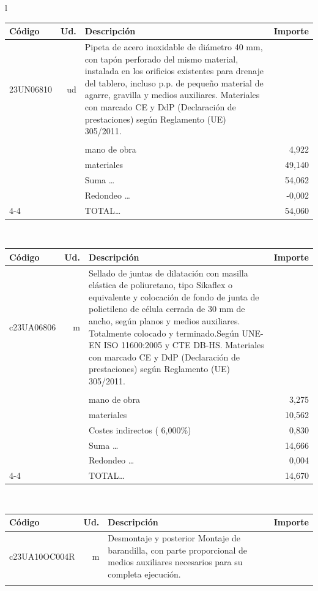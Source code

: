 \documentclass{book}%
\begin{document}
\begin{longtable}{l}
\begin{tabular}{l r p{60mm} r}%
Código&Ud.&Descripción&Importe\\%
\hline%
23UN06810&ud&Pipeta de acero inoxidable de diámetro 40 mm, con tapón perforado del mismo material, instalada en los orificios existentes para drenaje del tablero, incluso p.p. de pequeño material de agarre, gravilla y medios auxiliares. Materiales con marcado CE y DdP (Declaración de prestaciones) según Reglamento (UE) 305/2011.&\\%
&&&\\%
&&mano de obra&     4,922\\%
&&materiales&    49,140\\%
&&Suma \ldots&    54,062\\%
&&Redondeo \ldots&    {-}0,002\\%
\cline{4-4}%
&&TOTAL\ldots&    54,060\\%
\end{tabular}\\%
\begin{tabular}{l r p{60mm} r}%
Código&Ud.&Descripción&Importe\\%
\hline%
c23UA06806&m&Sellado de juntas de dilatación con masilla elástica de poliuretano, tipo Sikaflex o equivalente y colocación de fondo de junta de polietileno de célula cerrada de 30 mm de ancho, según planos y medios auxiliares. Totalmente colocado y terminado.Según UNE{-}EN ISO 11600:2005 y CTE DB{-}HS. Materiales con marcado CE y DdP (Declaración de prestaciones) según Reglamento (UE) 305/2011.&\\%
&&&\\%
&&mano de obra&     3,275\\%
&&materiales&    10,562\\%
&&Costes indirectos (     6,000\%)&     0,830\\%
&&Suma \ldots&    14,666\\%
&&Redondeo \ldots&     0,004\\%
\cline{4-4}%
&&TOTAL\ldots&    14,670\\%
\end{tabular}\\%
\begin{tabular}{l r p{60mm} r}%
Código&Ud.&Descripción&Importe\\%
\hline%
c23UA10OC004R&m&Desmontaje y posterior Montaje de barandilla, con parte proporcional de medios auxiliares necesarios para su completa ejecución.&\\%
&&&\\%

\end{tabular}
\end{longtable}
\end{document}
